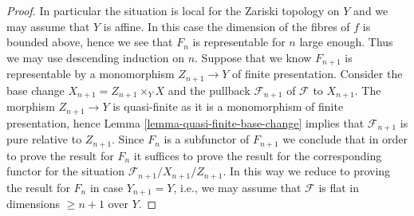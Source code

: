 \begin{proof}
\medskip\noindent
In particular the situation is local for the Zariski topology on $Y$
and we may assume that $Y$ is affine. In this case the dimension of the
fibres of $f$ is bounded above, hence we see that $F_n$ is representable
for $n$ large enough. Thus we may use descending induction on $n$.
Suppose that we know $F_{n + 1}$ is representable by a monomorphism
$Z_{n + 1} \to Y$ of finite presentation. Consider the base change
$X_{n + 1} = Z_{n + 1} \times_Y X$ and the pullback $\mathcal{F}_{n + 1}$
of $\mathcal{F}$ to $X_{n + 1}$. The morphism $Z_{n + 1} \to Y$ is
quasi-finite as it is a monomorphism of finite presentation, hence
Lemma \ref{lemma-quasi-finite-base-change}
implies that $\mathcal{F}_{n + 1}$ is pure relative to $Z_{n + 1}$.
Since $F_n$ is a subfunctor of $F_{n + 1}$ we conclude that in order
to prove the result for $F_n$ it suffices to prove the result for the
corresponding functor for the situation
$\mathcal{F}_{n + 1}/X_{n + 1}/Z_{n + 1}$.
In this way we reduce to proving the result for $F_n$ in case
$Y_{n + 1} = Y$, i.e., we may assume that $\mathcal{F}$ is flat
in dimensions $\geq n + 1$ over $Y$.


\end{proof}
